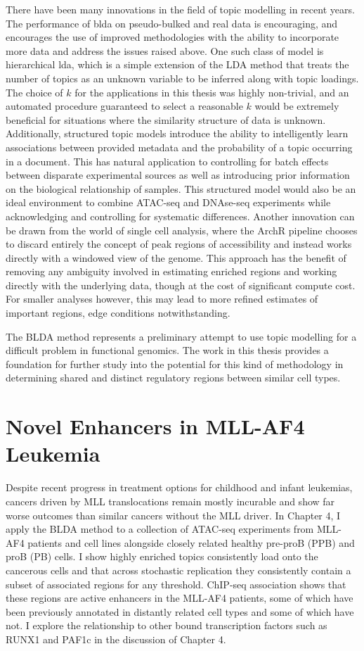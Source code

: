 There have been many innovations in the field of topic modelling in recent years. The performance of \gls{blda} on pseudo-bulked and real data is encouraging, and encourages the use of improved methodologies with the ability to incorporate more data and address the issues raised above. One such class of model is hierarchical \gls{lda}, which is a simple extension of the LDA method that treats the number of topics as an unknown variable to be inferred along with topic loadings. The choice of $k$ for the applications in this thesis was highly non-trivial, and an automated procedure guaranteed to select a reasonable $k$ would be extremely beneficial for situations where the similarity structure of data is unknown. Additionally, structured topic models introduce the ability to intelligently learn associations between provided metadata and the probability of a topic occurring in a document. This has natural application to controlling for batch effects between disparate experimental sources as well as introducing prior information on the biological relationship of samples. This structured model would also be an ideal environment to combine ATAC-seq and DNAse-seq experiments while acknowledging and controlling for systematic differences. Another innovation can be drawn from the world of single cell analysis, where the ArchR pipeline chooses to discard entirely the concept of peak regions of accessibility and instead works directly with a windowed view of the genome. This approach has the benefit of removing any ambiguity involved in estimating enriched regions and working directly with the underlying data, though at the cost of significant compute cost. For smaller analyses however, this may lead to more refined estimates of important regions, edge conditions notwithstanding. 

The BLDA method represents a preliminary attempt to use topic modelling for a difficult problem in functional genomics. The work in this thesis provides a foundation for further study into the potential for this kind of methodology in determining shared and distinct regulatory regions between similar cell types. 

\section{Novel Enhancers in MLL-AF4 Leukemia}

Despite recent progress in treatment options for childhood and infant leukemias, cancers driven by MLL translocations remain mostly incurable and show far worse outcomes than similar cancers without the MLL driver. In Chapter 4, I apply the BLDA method to a collection of ATAC-seq experiments from MLL-AF4 patients and cell lines alongside closely related healthy pre-proB (PPB) and proB (PB) cells. I show highly enriched topics consistently load onto the cancerous cells and that across stochastic replication they consistently contain a subset of associated regions for any threshold. ChIP-seq association shows that these regions are active enhancers in the MLL-AF4 patients, some of which have been previously annotated in distantly related cell types and some of which have not. I explore the relationship to other bound transcription factors such as RUNX1 and PAF1c in the discussion of Chapter 4. 

